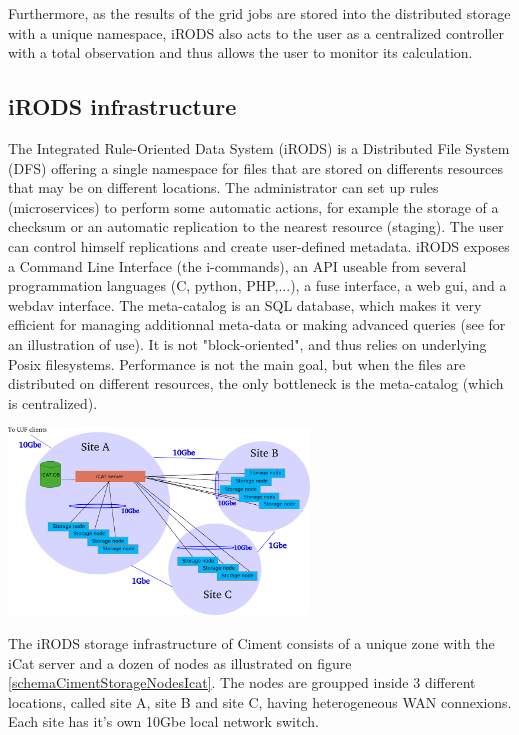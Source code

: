 \documentclass[a4paper, 10pt]{article}
\begin{document}
\begin{multicols}{2}
Furthermore, as the results of the grid jobs are stored into the distributed storage with a unique namespace, iRODS also acts to the user as a centralized controller with a 
total observation and thus allows the user to monitor its calculation.
~\\

\subsection{iRODS infrastructure}


The Integrated Rule-Oriented Data System (iRODS) is a Distributed File System (DFS) offering a single namespace for files that are stored on differents resources that may be on different locations. The administrator can set up rules (microservices) to perform some automatic actions, for example the storage of a checksum or an automatic replication to the nearest resource (staging).  The user can control himself replications and create user-defined metadata. iRODS exposes a Command Line Interface (the i-commands), an API useable from several programmation languages (C, python, PHP,...), a fuse interface, a web gui, and a webdav interface. The meta-catalog is an SQL database, which makes it very efficient for managing additionnal meta-data or making advanced queries (see \cite{key:CCQSC} for an illustration of use). It is not "block-oriented", and thus relies on underlying Posix filesystems. Performance is not the main goal, but when the files are distributed on different resources, the only bottleneck is the meta-catalog (which is centralized).
\\

\begin{center}%
\centering
{}
\includegraphics[width=8cm]{schemaCimentStorageNodesIcat.png}
\end{center}


The iRODS storage infrastructure of Ciment consists of a unique zone with the iCat server and a dozen of nodes as illustrated on figure \ref{schemaCimentStorageNodesIcat}. The nodes are groupped inside 3 different locations, called site A, site B and site C, having heterogeneous WAN connexions. Each site has it's own 10Gbe local network switch.


\end{multicols}
\end{document}
